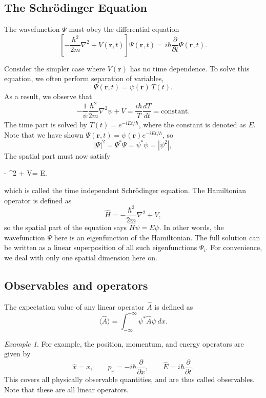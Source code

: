 \documentclass[11pt]{article}
\newcommand\ve[1]{\boldsymbol{#1}}
\newcommand\ddt[1]{\frac{d #1}{d t}}
\newcommand\ppx[1]{\frac{\partial #1}{\partial x}}
\newcommand\ppt[1]{\frac{\partial #1}{\partial t}}
\newcommand\lapl[1]{\nabla^2 #1}
\newcommand\E[1]{\langle #1 \rangle}
\theoremstyle{definition}
\newenvironment{boxedeq*}%
    {\begin{equationbox}\begin{equation*}}%
    {\end{equation*}\end{equationbox}}
\theoremstyle{remark}
\newtheorem*{example}{Example}
\numberwithin{equation}{section}
\begin{document}
    \subsection{The Schr\"odinger Equation}
    \begin{theorem}
        The wavefunction $\Psi$ must obey the differential equation \[
            \left[-\frac{\hbar^2}{2m}\lapl{} + V(\ve{r}, t)\right]\Psi(\ve{r}, t) =
            i\hbar \ppt{}\Psi(\ve{r}, t).
        \] 
    \end{theorem}
    Consider the simpler case where $V(\ve{r})$ has no time dependence.
    To solve this equation, we often perform separation of variables, \[
        \Psi(\ve{r}, t) = \psi(\ve{r})\, T(t).
    \] As a result, we observe that \[
        -\frac{1}{\psi}\frac{\hbar^2}{2m}\lapl{\psi} + V = \frac{i\hbar}{T}\ddt{T} =
        \text{constant}.
    \] The time part is solved by $T(t) = e^{-i E t/ \hbar}$, where the constant is
    denoted as $E$.  Note that we have shown $\Psi(\ve{r}, t) = \psi(\ve{r}) e^{-iEt
    /\hbar}$, so \[
        |\Psi|^2 = \Psi^*\Psi = \psi^*\psi = |\psi^2|,
    \] The spatial part must now satisfy 
    \begin{boxedeq*}
        - \lapl{\psi} + V\psi = E\psi.
    \end{boxedeq*}
    which is called the time independent Schr\"odinger equation.
    The Hamiltonian operator is defined as \[
        \hat{H} = -\frac{\hbar^2}{2m}\lapl{} + V,
    \] so the spatial part of the equation says $\hat{H}\psi = E\psi$.
    In other words, the wavefunction $\Psi$ here is an eigenfunction of the
    Hamiltonian. The full solution can be written as a linear superposition of all
    such eigenfunctions $\Psi_i$.
    For convenience, we deal with only one spatial dimension here on.

    \subsection{Observables and operators}
    \begin{definition}
        The expectation value of any linear operator $\hat{A}$ is defined as \[
            \E{\hat{A}} = \int_{-\infty}^{+\infty} \psi^* \hat{A} \psi \:dx.
        \]
    \end{definition}
    \begin{example}
        For example, the position, momentum, and energy operators are given by \[
            \hat{x} = x, \qquad \hat{p}_x = -i\hbar \ppx{}, \qquad \hat{E} = i\hbar
            \ppt{}.
        \] 
        This covers all physically observable quantities, and are thus called
        observables. Note that these are all linear operators.
    \end{example}
\end{document}
